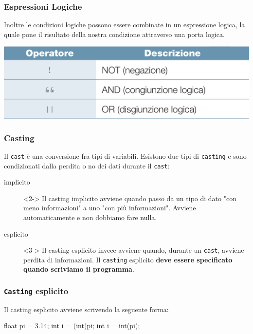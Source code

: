 \documentclass[handout]{beamer}
\begin{document}
    \begin{frame}
        \frametitle{Espressioni Logiche}
        Inoltre le condizioni logiche possono essere combinate in un espressione logica, la quale pone il risultato della nostra condizione attraverso una porta logica.
        \begin{center}
             \includegraphics[scale=0.2]{img/logic_expressions.png}
        \end{center}
    \end{frame}

    \begin{frame}
        \frametitle{Casting}
        Il \texttt{cast} è una conversione fra tipi di variabili. Esistono due tipi di \texttt{casting} e sono condizionati dalla perdita o no dei dati durante il \texttt{cast}:
        \begin{description}
            \item[ implicito]<2-> Il casting implicito avviene quando passo da un tipo di dato "con meno informazioni" a uno "con più informazioni". Avviene automaticamente e non dobbiamo fare nulla.
            \item[ esplicito]<3-> Il casting esplicito invece avviene quando, durante un \texttt{cast}, avviene perdita di informazioni. Il \texttt{casting} esplicito \textbf{deve essere specificato quando scriviamo il programma}.
        \end{description}
    \end{frame}

    \begin{frame}[fragile]
        \frametitle{\texttt{Casting} esplicito}
        Il casting esplicito avviene scrivendo la seguente forma:
        \begin{center}
            \begin{cppcode}
                float pi = 3.14;
                int i = (int)pi;
                int i = int(pi);
            \end{cppcode}
        \end{center}
    \end{frame}
\end{document}
